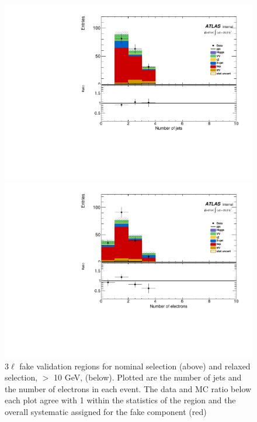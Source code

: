 \begin{figure}[!htbp]
\begin{minipage}[h]{0.5\textwidth}
    \centering \includegraphics[width=\textwidth]{figs/fake/plotCand_3lep_LowNJet_NJet}
  \end{minipage}\hfill
  \begin{minipage}[h]{0.5\textwidth}
    \centering \includegraphics[width=\textwidth]{figs/fake/plotCand_3lep_LowNJet_NElec}
  \end{minipage}\hfill
  \caption{ 3$\ell$ fake validation regions for nominal \pt selection (above) and relaxed \pt selection, $>$ 10 GeV, (below). Plotted are the number of jets and the number of electrons in each event. The data and MC ratio below each plot agree with 1 within the statistics of the region and the overall systematic assigned for the fake component (red)}  
  \label{figure:background_3lvaldiation}
\end{figure} 



